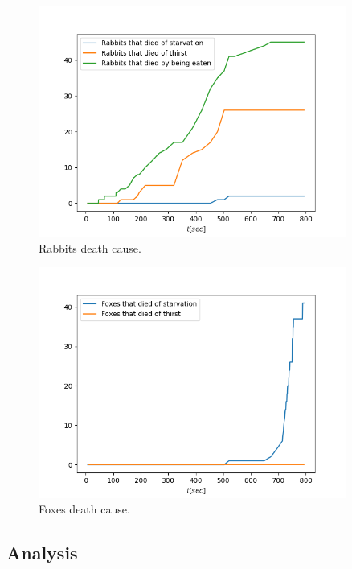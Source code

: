 \begin{figure}[H]
    \centering
    \includegraphics[width=0.9\textwidth]{Images/SimulationResults/Simulation_5_Rabbits that died of starvation_Rabbits that died of thirst_Rabbits that died by being eaten.png}
    \caption{Rabbits death cause.}
    \label{fig:simulation3RabbitDeathCause}
\end{figure}

\begin{figure}[H]
    \centering
    \includegraphics[width=0.9\textwidth]{Images/SimulationResults/Simulation_5_Foxes that died of starvation_Foxes that died of thirst.png}
    \caption{Foxes death cause.}
    \label{fig:simulation3FoxDeathCause}
\end{figure}

\subsection{Analysis}
